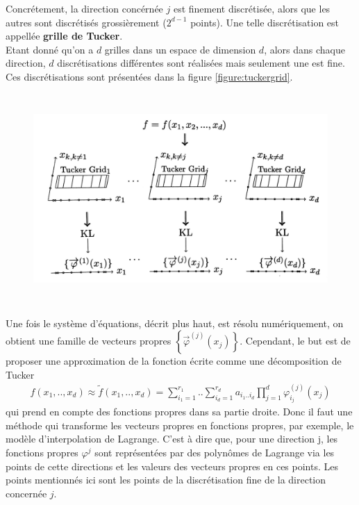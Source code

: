 Concrétement, la direction concérnée $j$ est finement discrétisée, alors que les autres sont discrétisés grossièrement ($2^{d-1}$ points). Une telle discrétisation est appellée \textbf{grille de Tucker}. \\
Etant donné qu'on a $d$ grilles dans un espace de dimension $d$, alors dans chaque direction, $d$ discrétisations différentes sont réalisées mais seulement une est fine. Ces discrétisations sont présentées dans la figure
\ref{figure:tuckergrid}.
\begin{center}
\begin{figure}[!h]
    \centering
		\includegraphics[width=\linewidth,height=8cm]{images/tuckergrid.jpg}
\end{figure}
\label{figure:tuckergrid}
\end{center}

Une fois le système d'équations, décrit plus haut, est résolu numériquement, on obtient une famille de vecteurs propres $\left \{ \overrightarrow{\varphi}^{(j)}(x_j) \right \}$.
Cependant, le but est de proposer une approximation de la fonction écrite comme une décomposition de Tucker
\begin{align}
	f(x_1,..,x_d) \approx \tilde{f}(x_1,..,x_d) = \sum_{i_1=1}^{r_1}..\sum_{i_d=1}^{r_d}a_{i_1..i_d}\prod_{j=1}^d \varphi_{i_j}^{(j)}(x_j)
\end{align}
qui prend en compte des fonctions propres dans sa partie droite. Donc il faut une méthode qui transforme les vecteurs propres en fonctions propres,
par exemple, le modèle d'interpolation de Lagrange. C'est à dire que, pour une direction j, les fonctions propres $\varphi^{j}$ sont représentées par des polynômes de Lagrange via les points de cette directions et les
valeurs des vecteurs propres en ces points. Les points mentionnés ici sont les points de la discrétisation fine de la direction concernée $j$.

